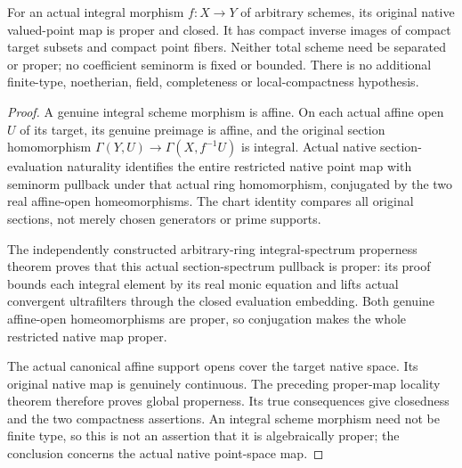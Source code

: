 \begin{theorem}
\label{scheme:integral-native-proper-map}
\leanok
{}
For an actual integral morphism $f:X\to Y$ of arbitrary schemes, its
original native valued-point map is proper and closed. It has compact
inverse images of compact target subsets and compact point fibers.
Neither total scheme need be separated or proper; no coefficient
seminorm is fixed or bounded. There is no additional finite-type,
noetherian, field, completeness or local-compactness hypothesis.
\end{theorem}
\begin{proof}
A genuine integral scheme morphism is affine. On each actual affine
open $U$ of its target, its genuine preimage is affine, and the original
section homomorphism
$\Gamma(Y,U)\to\Gamma(X,f^{-1}U)$ is integral.
Actual native section-evaluation naturality identifies the entire
restricted native point map with seminorm pullback under that actual
ring homomorphism, conjugated by the two real affine-open
homeomorphisms. The chart identity compares all original sections,
not merely chosen generators or prime supports.

The independently constructed arbitrary-ring integral-spectrum
properness theorem proves that this actual section-spectrum pullback
is proper: its proof bounds each integral element by its real monic
equation and lifts actual convergent ultrafilters through the closed
evaluation embedding. Both genuine affine-open homeomorphisms are
proper, so conjugation makes the whole restricted native map proper.

The actual canonical affine support opens cover the target native
space. Its original native map is genuinely continuous. The preceding
proper-map locality theorem therefore proves global properness. Its
true consequences give closedness and the two compactness assertions.
An integral scheme morphism need not be finite type, so this is not an
assertion that it is algebraically proper; the conclusion concerns the
actual native point-space map.
\end{proof}

